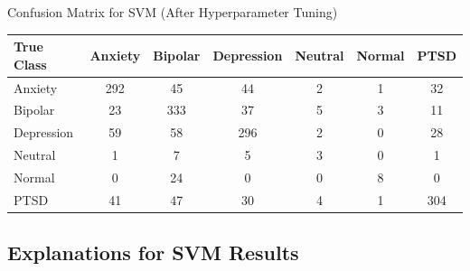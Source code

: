 \begin{center}
\caption{Confusion Matrix for SVM (After Hyperparameter Tuning)}
\begin{tabular}{|l|c|c|c|c|c|c|}
\hline
\textbf{True Class} & \textbf{Anxiety} & \textbf{Bipolar} & \textbf{Depression} & \textbf{Neutral} & \textbf{Normal} & \textbf{PTSD} \\ \hline
Anxiety             & 292              & 45               & 44                  & 2                & 1               & 32            \\ \hline
Bipolar             & 23               & 333              & 37                  & 5                & 3               & 11            \\ \hline
Depression          & 59               & 58               & 296                 & 2                & 0               & 28            \\ \hline
Neutral             & 1                & 7                & 5                   & 3                & 0               & 1             \\ \hline
Normal              & 0                & 24               & 0                   & 0                & 8               & 0             \\ \hline
PTSD                & 41               & 47               & 30                  & 4                & 1               & 304           \\ \hline
\end{tabular}
\end{center}

\subsection{Explanations for SVM Results}

